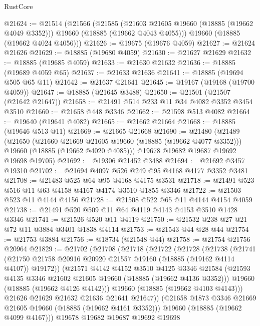 \begin{lexlean}{RustCore}
\begin{coremodule}
@21624 := @21514
    (@21566
      (@21585
        (@21603 @21605 @19660 (@18885 (@19662 @4049 @3352)))
        @19660
        (@18885 (@19662 @4043 @4055)))
      @19660
      (@18885 (@19662 @4024 @4056)))
@21626 := @19675 (@19676 @4059)
@21627 := @21624 @21626
@21629 := @18885 (@19680 @4059)
@21630 := @21627 @21629
@21632 := @18885 (@19685 @4059)
@21633 := @21630 @21632
@21636 := @18885 (@19689 @4059 @65)
@21637 := @21633 @21636
@21641 := @18885 (@19694 @505 @65 @11)
@21642 := @21637 @21641
@21645 := @19167 (@19168 (@19700 @4059))
@21647 := @18885 (@21645 @3488)
@21650 := @21501 (@21507 (@21642 @21647))
@21658 := @21491 @514 @233 @11 @34 @4082 @3352 @3454 @3510
@21660 := @21658 @448 @3346
@21662 := @21598 @513 @4082
@21664 := @19640 (@19641 @4082)
@21665 := @21662 @21664
@21668 := @18885 (@19646 @513 @11)
@21669 := @21665 @21668
@21690 := @21480
    (@21489
      (@21650
        (@21660 @21669 @21605 @19660 (@18885 (@19662 @4077 @3352)))
        @19660
        (@18885 (@19662 @4020 @4085)))
      @19678
      @19682
      @19687
      @19692
      @19698
      @19705)
@21692 := @19306 @21452 @3488
@21694 := @21692 @3457 @19310
@21702 := @21694 @4097 @526 @249 @95 @4168 @4177 @3352 @3481
@21708 := @21483 @525 @64 @95 @4168 @4175 @3531
@21718 := @21491 @523 @516 @11 @63 @4158 @4167 @4174 @3510 @1855 @3346
@21722 := @21503 @523 @11 @4144 @4156
@21728 := @21508 @522 @65 @11 @4144 @4154 @4059
@21738 := @21491 @520 @509 @11 @64 @4119 @4143 @4153 @3510 @1428 @3346
@21741 := @21526 @520 @11 @4119
@21750 := @21532 @238 @27 @21 @72 @11 @3884 @3401 @1838 @4114
@21753 := @21543 @44 @28 @44
@21754 := @21753 @3884
@21756 := @18734 (@21548 @44)
@21758 := @21754 @21756 @20964
@21829 := @21702
    (@21708
      (@21718
        (@21722
          (@21728
            (@21738
              (@21741
                (@21750 @21758 @20916 @20920 @21557 @19160 (@18885 (@19162 @4114 @4107)) @19172))
              (@21571
                @4142
                @4152
                @3510
                @4125
                @3346
                @21584
                (@21593 @4135 @3346 @21602 @21605 @19660 (@18885 (@19662 @4136 @3352)))
                @19660
                (@18885 (@19662 @4126 @4142)))
              @19660
              (@18885 (@19662 @4103 @4143)))
            @21626
            @21629
            @21632
            @21636
            @21641
            @21647))
        (@21658 @1873 @3346 @21669 @21605 @19660 (@18885 (@19662 @4161 @3352)))
        @19660
        (@18885 (@19662 @4099 @4167)))
      @19678
      @19682
      @19687
      @19692
      @19698

\end{coremodule}
\end{lexlean}
